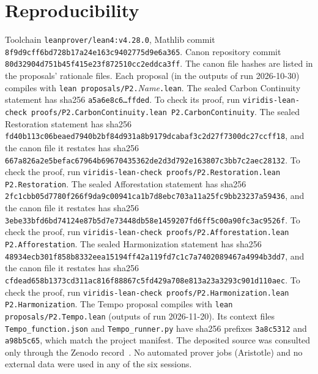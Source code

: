 \documentclass[11pt]{article}
\theoremstyle{definition}
\theoremstyle{remark}
\begin{document}
\section{Reproducibility}
Toolchain \texttt{leanprover/lean4:v4.28.0}, Mathlib commit \texttt{8f9d9cff6bd728b17a24e163c9402775d9e6a365}.
Canon repository commit \texttt{80d32904d751b45f415e23f872510cc2eddca3ff}. The canon file hashes are listed in the proposals' rationale files.
Each proposal (in the outputs of run 2026-10-30) compiles with \texttt{lean proposals/P2.}\textit{Name}\texttt{.lean}.
The sealed Carbon Continuity statement has sha256 \texttt{a5a6e8c6\ldots ffded}. To check its proof, run
\texttt{viridis-lean-check proofs/P2.CarbonContinuity.lean P2.CarbonContinuity}.
The sealed Restoration statement has sha256 \texttt{fd40b113c06beaed7940b2bf84d931a8b9179dcabaf3c2d27f7300dc27ccff18},
and the canon file it restates has sha256 \texttt{667a826a2e5befac67964b69670435362de2d3d792e163807c3bb7c2aec28132}.
To check the proof, run \texttt{viridis-lean-check proofs/P2.Restoration.lean P2.Restoration}.
The sealed Afforestation statement has sha256 \texttt{2fc1cbb05d7780f266f9da9c00941ca1b7d8ebc703a11a25fc9bb23237a59436},
and the canon file it restates has sha256 \texttt{3ebe33bfd6bd74124e87b5d7e73448db58e1459207fd6ff5c00a90fc3ac9526f}.
To check the proof, run \texttt{viridis-lean-check proofs/P2.Afforestation.lean P2.Afforestation}.
The sealed Harmonization statement has sha256 \texttt{48934ecb301f858b8332eea15194ff42a119fd7c1c7a7402089467a4994b3dd7},
and the canon file it restates has sha256 \texttt{cfdead658b1373cd311ac816f88867c5fd429a708e813a23a3293c901d110aec}.
To check the proof, run \texttt{viridis-lean-check proofs/P2.Harmonization.lean P2.Harmonization}.
The Tempo proposal compiles with \texttt{lean proposals/P2.Tempo.lean} (outputs of run 2026-11-20). Its context files
\texttt{Tempo\_function.json} and \texttt{Tempo\_runner.py} have sha256 prefixes \texttt{3a8c5312} and \texttt{a98b5c65}, which match
the project manifest. The deposited source was consulted only through the Zenodo record~\cite{HartTempo2026}.
No automated prover jobs (Aristotle) and no external data were used in any of the six sessions.
\end{document}
